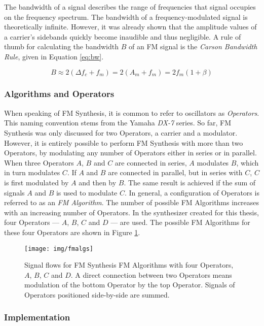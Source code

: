 The bandwidth of a signal describes the range of frequencies that signal occupies on the frequency spectrum. The bandwidth of a frequency-modulated signal is theoretically infinite. However, it was already shown that the amplitude values of a carrier's sidebands quickly become inaudible and thus negligible. A rule of thumb for calculating the bandwidth $B$ of an FM signal is the \emph{Carson Bandwidth Rule}, given in Equation \ref{eq:bw}.

  \begin{equation}
    B \approx 2(\Delta f_{c} + f_{m}) = 2(A_{m} + f_{m}) = 2f_{m}(1 + \beta)
    \label{eq:bw}
  \end{equation}

  \subsubsection{Algorithms and Operators}

  When speaking of FM Synthesis, it is common to refer to oscillators as \emph{Operators}. This naming convention stems from the Yamaha \emph{DX-7} series. So far, FM Synthesis was only discussed for two Operators, a carrier and a modulator. However, it is entirely possible to perform FM Synthesis with more than two Operators, by modulating any number of Operators either in series or in parallel. When three Operators $A$, $B$ and $C$ are connected in series, $A$ modulates $B$, which in turn modulates $C$. If $A$ and $B$ are connected in parallel, but in series with $C$, $C$ is first modulated by $A$ and then by $B$. The same result is achieved if the sum of signals $A$ and $B$ is used to modulate $C$. In general, a configuration of Operators is referred to as an \emph{FM Algorithm}. The number of possible FM Algorithms increases with an increasing number of Operators. In the synthesizer created for this thesis, four Operators --- $A$, $B$, $C$ and $D$ --- are used. The possible FM Algorithms for these four Operators are shown in Figure \ref{fig:fmalgs}.

  \begin{figure}[p!]
    \texttt{[image: img/fmalgs]}
    \caption{Signal flows for FM Synthesis FM Algorithms with four Operators, $A$, $B$, $C$ and $D$. A direct connection between two Operators means modulation of the bottom Operator by the top Operator. Signals of Operators positioned side-by-side are summed.}
    \label{fig:fmalgs}
  \end{figure}

  \subsubsection{Implementation}

